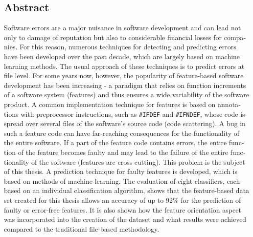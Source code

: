 \begin{otherlanguage}{english}
    \section*{Abstract}
    
Software errors are a major nuisance in software development and can lead not only to damage of reputation but also to considerable financial losses for companies. For this reason, numerous techniques for detecting and predicting errors have been developed over the past decade, which are largely based on machine learning methods. The usual approach of these techniques is to predict errors at file level. For some years now, however, the popularity of feature-based software development has been increasing - a paradigm that relies on function increments of a software system (features) and thus ensures a wide variability of the software product. A common implementation technique for features is based on annotations with preprocessor instructions, such as \texttt{\#IFDEF} and \texttt{\#IFNDEF}, whose code is spread over several files of the software's source code (\glqq code scattering\grqq). A bug in such a feature code can have far-reaching consequences for the functionality of the entire software. If a part of the feature code contains errors, the entire function of the feature becomes faulty and may lead to the failure of the entire functionality of the software (features are \glqq cross-cutting\grqq{}). This problem is the subject of this thesis. A prediction technique for faulty features is developed, which is based on methods of machine learning. The evaluation of eight classifiers, each based on an individual classification algorithm, shows that the feature-based data set created for this thesis allows an accuracy of up to 92\% for the prediction of faulty or error-free features. It is also shown how the feature orientation aspect was incorporated into the creation of the dataset and what results were achieved compared to the traditional file-based methodology.

\end{otherlanguage}
\cleardoublepage
